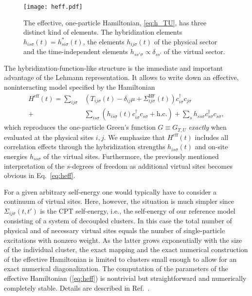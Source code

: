 \documentclass[twocolumn,prb,showpacs,aps,superscriptaddress]{revtex4}
\newcommand{\cds}[1]{\ensuremath{c^\dagger_{#1}}}
\newcommand{\ccs}[1]{\ensuremath{c_{#1}}}
\begin{document}
\begin{figure}
  \texttt{[image: heff.pdf]}
  \caption
  {
    The effective, one-particle Hamiltonian, \eqref{eq:h_TU}, has three
    distinct kind of elements. The hybridization elements $h_{is\sigma}(t) =
    h^*_{si\sigma}(t)$, the elements $h_{ij\sigma}(t)$ of the physical sector
    and the time-independent elements $h_{ss'\sigma} \propto \delta_{ss'}$ of
    the virtual sector.
  }
  \label{fig:hcpt}
\end{figure}
The hybridization-function-like structure is the immediate and important
advantage of the Lehmann representation. It allows to write down an effective,
noninteracting model specified by the Hamiltonian
\begin{align}
  \label{eq:heff}
  H^\mathrm{eff}(t) 
  = 
  \sum_{ij\sigma} 
  &
  \left(
    T_{ij\sigma}(t) - \delta_{ij}\mu + \Sigma^\mathrm{HF}_{ij\sigma}(t)
  \right)
  \cds{i\sigma}\ccs{j\sigma}\\ 
  +
  &\sum_{is\sigma} 
  \left(
    h_{is\sigma}(t)
    \cds{i\sigma}\ccs{s\sigma} + \mathrm{h.c.}
  \right) 
  + 
  \sum_s h_{ss\sigma} \cds{s\sigma}\ccs{s\sigma}
  \nonumber , 
\end{align}
which reproduces the one-particle Green's function $G \equiv G_{T,U}$
\emph{exactly} when evaluated at the physical sites $i,j$. We emphasize that
$H^\mathrm{eff}(t)$ includes all correlation effects through the hybridization
strengths $h_{is\sigma}(t)$ and on-site energies $h_{ss\sigma}$ of the virtual
sites. Furthermore, the previously mentioned interpretation of the $s$-degrees
of freedom as additional virtual sites becomes obvious in Eq.\ \eqref{eq:heff}.

For a given arbitrary self-energy one would typically have to consider a continuum of virtual sites. 
Here, however, the situation is much simpler since $\Sigma_{ij\sigma}(t,t')$ is the CPT self-energy, i.e., the self-energy of our reference model consisting of a system of decoupled clusters. 
In this case the total number of physical and of necessary virtual sites equals the number of single-particle excitations with nonzero weight. \cite{GP15} 
As the latter grows exponentially with the size of the individual cluster, the exact mapping and the exact numerical
construction of the effective Hamiltonian is limited to clusters small enough to allow for an exact numerical diagonalization.
The computation of the parameters of the effective Hamiltonian (\ref{eq:heff}) is nontrivial but straightforward and numerically completely stable. 
Details are described in Ref.\ .
\end{document}
